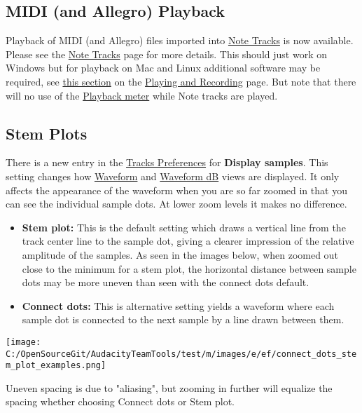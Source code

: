 \begin{multicols}{2}
\subsection{MIDI (and Allegro) Playback}
\label{new:features:in:this:release:midi}Playback of MIDI (and Allegro) files imported into 
\hyperref[\foo{note:tracks:}]{Note Tracks}
 is now available.  Please see the 
\hyperref[\foo{note:tracks:}]{Note Tracks}
 page for more details.
This should just work on Windows but for playback on Mac and Linux additional software may be required, see 
\hyperref[\foo{playing:and:recording:midi}]{this section}
 on the 
\hyperref[\foo{playing:and:recording:}]{Playing and Recording}
 page.
But note that there will no use of the 
\hyperref[\foo{meter:toolbar:playback}]{Playback meter}
 while Note tracks are played. 

\subsection{Stem Plots}
\label{new:features:in:this:release:stemplots}There is a new entry in the 
\hyperref[\foo{tracks:preferences:}]{Tracks Preferences}
 for \textbf{Display samples}.  This setting changes how 
\hyperref[\foo{audacity:waveform:}]{Waveform}
 and 
\hyperref[\foo{audacity:waveform:db}]{Waveform dB}
 views are displayed.  It only affects the appearance of the waveform when you are so far zoomed in that you can see the individual sample dots.  At lower zoom levels it makes no difference.  

\begin{itemize}
\item \textbf{Stem plot:} This is the default setting which draws a vertical line from the track center line to the sample dot, giving a clearer impression of the relative amplitude of the samples. As seen in the images below, when zoomed out close to the minimum for a stem plot, the horizontal distance between sample dots may be more uneven than seen with the connect dots default.   
\item \textbf{Connect dots:} This is alternative setting yields a waveform where each sample dot is connected to the next sample by a line drawn between them.  
\end{itemize}
\par \protect\texttt{[image: C:/OpenSourceGit/AudacityTeamTools/test/m/images/e/ef/connect\_dots\_stem\_plot\_examples.png]}\par Uneven spacing is due to "aliasing", but zooming in further will equalize the spacing whether choosing Connect dots or Stem plot.

\end{multicols}
